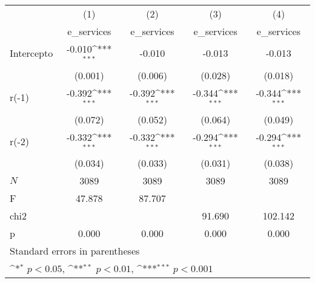 {
\def\sym#1{\ifmmode^{#1}\else\(^{#1}\)\fi}
\begin{longtable}{l*{4}{c}}
\hline\hline\endfirsthead\hline\endhead\hline\endfoot\endlastfoot
            &\multicolumn{1}{c}{(1)}&\multicolumn{1}{c}{(2)}&\multicolumn{1}{c}{(3)}&\multicolumn{1}{c}{(4)}\\
            &\multicolumn{1}{c}{e\_services}&\multicolumn{1}{c}{e\_services}&\multicolumn{1}{c}{e\_services}&\multicolumn{1}{c}{e\_services}\\
\hline
Intercepto  &      -0.010\sym{***}&      -0.010         &      -0.013         &      -0.013         \\
            &     (0.001)         &     (0.006)         &     (0.028)         &     (0.018)         \\
r(-1)       &      -0.392\sym{***}&      -0.392\sym{***}&      -0.344\sym{***}&      -0.344\sym{***}\\
            &     (0.072)         &     (0.052)         &     (0.064)         &     (0.049)         \\
r(-2)       &      -0.332\sym{***}&      -0.332\sym{***}&      -0.294\sym{***}&      -0.294\sym{***}\\
            &     (0.034)         &     (0.033)         &     (0.031)         &     (0.038)         \\
\hline
\(N\)       &        3089         &        3089         &        3089         &        3089         \\
F           &      47.878         &      87.707         &                     &                     \\
chi2        &                     &                     &      91.690         &     102.142         \\
p           &       0.000         &       0.000         &       0.000         &       0.000         \\
\hline\hline
\multicolumn{5}{l}{\footnotesize Standard errors in parentheses}\\
\multicolumn{5}{l}{\footnotesize \sym{*} \(p<0.05\), \sym{**} \(p<0.01\), \sym{***} \(p<0.001\)}\\
\end{longtable}
}
